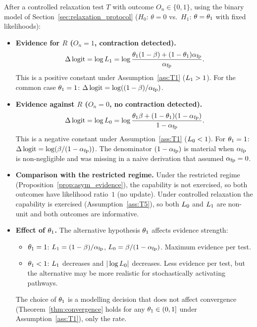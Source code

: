\begin{proposition}
\label{prop:evidence_strength}
After a controlled relaxation test $T$ with outcome
$O_n \in \{0, 1\}$, using the binary model of
Section~\ref{sec:relaxation_protocol} ($H_0$: $\theta = 0$ vs.\
$H_1$: $\theta = \theta_1$ with fixed likelihoods):
\begin{itemize}
\item[(a)] \textbf{Evidence for $R$ ($O_n = 1$, contraction
  detected).}
  \begin{equation}
  \label{eq:log_L1}
  \Delta \operatorname{logit} = \log L_1
    = \log \frac{\theta_1 (1 - \beta) + (1 - \theta_1) \alpha_{\mathrm{fp}}}{\alpha_{\mathrm{fp}}}.
  \end{equation}
  This is a positive constant under
  Assumption~\ref{ass:T1} ($L_1 > 1$).  For the common case
  $\theta_1 = 1$: $\Delta \operatorname{logit} = \log((1 - \beta)/\alpha_{\mathrm{fp}})$.
\item[(b)] \textbf{Evidence against $R$ ($O_n = 0$, no
  contraction detected).}
  \begin{equation}
  \label{eq:log_L0}
  \Delta \operatorname{logit} = \log L_0
    = \log \frac{\theta_1 \beta + (1 - \theta_1)(1 - \alpha_{\mathrm{fp}})}{1 - \alpha_{\mathrm{fp}}}.
  \end{equation}
  This is a negative constant under
  Assumption~\ref{ass:T1} ($L_0 < 1$).  For $\theta_1 = 1$:
  $\Delta \operatorname{logit} = \log(\beta / (1 - \alpha_{\mathrm{fp}}))$.  The
  denominator $(1 - \alpha_{\mathrm{fp}})$ is material when $\alpha_{\mathrm{fp}}$ is
  non-negligible and was missing in a naive derivation that
  assumed $\alpha_{\mathrm{fp}} = 0$.
\item[(c)] \textbf{Comparison with the restricted regime.}
  Under the restricted regime
  (Proposition~\ref{prop:asym_evidence}), the capability is not
  exercised, so both outcomes have likelihood ratio~$1$ (no
  update).  Under controlled relaxation the capability is
  exercised
  (Assumption~\ref{ass:T5}), so both $L_0$ and $L_1$ are
  non-unit and both outcomes are informative.
\item[(d)] \textbf{Effect of $\theta_1$.}
  The alternative hypothesis $\theta_1$ affects evidence
  strength:
  \begin{itemize}
  \item $\theta_1 = 1$: $L_1 = (1-\beta)/\alpha_{\mathrm{fp}}$, $L_0 =
    \beta/(1-\alpha_{\mathrm{fp}})$.  Maximum evidence per test.
  \item $\theta_1 < 1$: $L_1$ decreases and $|\log L_0|$
    decreases.  Less evidence per test, but the alternative may
    be more realistic for stochastically activating pathways.
  \end{itemize}
  The choice of $\theta_1$ is a modelling decision that does
  not affect convergence (Theorem~\ref{thm:convergence} holds
  for any $\theta_1 \in (0, 1]$ under
  Assumption~\ref{ass:T1}), only the rate.
\end{itemize}
\end{proposition}

